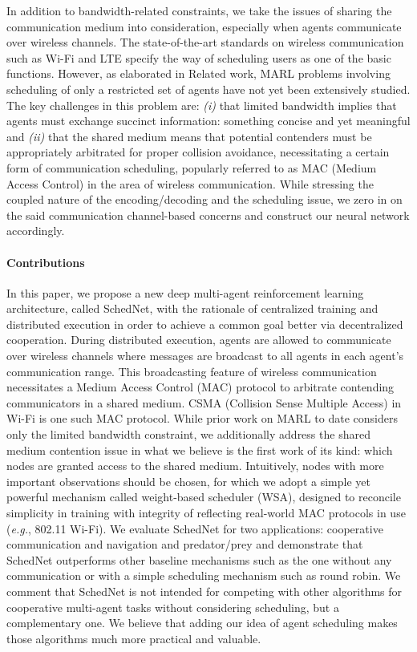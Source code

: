 \documentclass{article} %
\newcommand{\sched}{SchedNet}
\newcommand{\myparagraph}[1]{\vspace{-0.25cm} \paragraph{#1}}
\begin{document}
In addition to bandwidth-related constraints, we take the issues of
sharing the communication medium into consideration, especially when
agents communicate over wireless channels. The state-of-the-art standards on wireless communication such as Wi-Fi and LTE specify the way of scheduling users as one of the basic functions. However, as elaborated in
Related work, MARL problems involving scheduling of only a restricted set
of agents have not yet been extensively studied. The key challenges in
this problem are: {\em (i)} that limited bandwidth implies that agents must
exchange succinct information: something concise and yet meaningful
and {\em (ii)} that the shared medium means that potential contenders must
be appropriately arbitrated for proper collision avoidance,
necessitating a certain form of communication scheduling, popularly 
referred to as MAC (Medium Access Control) in the area of wireless
communication.  While stressing the coupled nature of the
encoding/decoding and the scheduling issue, we zero in on the said
communication channel-based concerns and construct our neural network
accordingly.

\myparagraph{Contributions} In this paper, we propose a new deep
multi-agent reinforcement learning architecture, called {\sched}, with
the rationale of centralized training and distributed execution in
order to achieve a common goal better via decentralized cooperation.
During distributed execution, agents are allowed to communicate over
wireless channels where messages are broadcast to all agents in each
agent's communication range. This broadcasting feature of wireless
communication necessitates a Medium Access Control (MAC) protocol to
arbitrate contending communicators in a shared medium. CSMA (Collision
Sense Multiple Access)  in Wi-Fi is one such
MAC protocol. While prior work on MARL to date considers only the
limited bandwidth constraint, we additionally address the shared
medium contention issue in what we believe is the first work of its
kind: which nodes are granted access to the shared medium.
Intuitively, nodes with more important observations should be chosen,
for which we adopt a simple yet powerful mechanism called weight-based
scheduler (WSA), designed to reconcile simplicity in training with
integrity of reflecting real-world MAC protocols in use ({\em e.g.},
802.11 Wi-Fi).  We evaluate {\sched} for two applications: cooperative
communication and navigation and predator/prey and demonstrate that
{\sched} outperforms other baseline mechanisms such as the one without
any communication or with a simple scheduling mechanism such as round
robin.  We comment that {\sched} is not intended for competing with
other algorithms for cooperative multi-agent tasks without considering
scheduling, but a complementary one. We believe that adding our idea
of agent scheduling makes those algorithms much more practical and
valuable.
\end{document}
